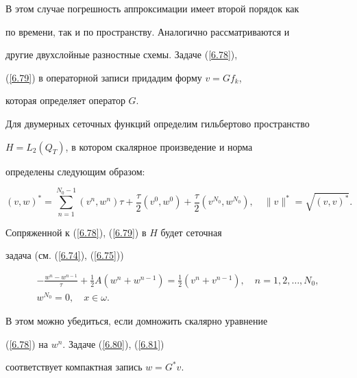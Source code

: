 В этом случае погрешность аппроксимации имеет второй порядок как


по времени, так и по пространству. Аналогично рассматриваются и


другие двухслойные разностные схемы. Задаче (\ref{6.78}),


(\ref{6.79}) в операторной записи придадим форму $v = G f_k$,


которая определяет оператор $G$.





Для двумерных сеточных функций определим гильбертово пространство


$H = L_2(Q_{T})$, в котором скалярное произведение и норма


определены следующим образом:


$$


(v,w)^* = \sum_{n=1}^{N_0 -1} (v^n, w^n) \tau +


\frac{\tau}{2} (v^0, w^0) +


\frac{\tau}{2} (v^{N_0}, w^{N_0}) ,


\quad \|v\|^* = \sqrt{(v,v)^*} .


$$





Сопряженной к (\ref{6.78}), (\ref{6.79}) в $H$ будет сеточная


задача (см. (\ref{6.74}), (\ref{6.75}))


\begin{gather}\label{6.80}


- \frac{w^{n} - w^{n-1}}{\tau} + \frac{1}{2}A(w^{n} + w^{n-1}) =


\frac{1}{2}( v^{n} + v^{n-1}),


\quad n = 1,2,\dotsc, N_0, \\


%


\label{6.81}


w^{N_0} = 0 ,


\quad x \in \omega .


\end{gather}


В этом можно убедиться, если домножить скалярно уравнение


(\ref{6.78}) на $w^n$. Задаче (\ref{6.80}), (\ref{6.81})


соответствует компактная запись $w = G^* v$.





